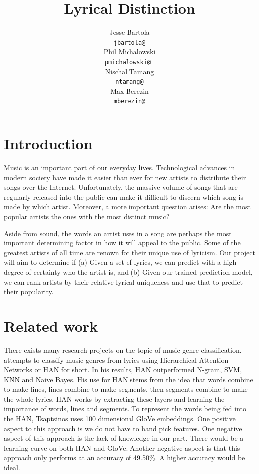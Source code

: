 \documentclass[11pt,a4paper]{article}
\title{Lyrical Distinction}
\author{Jesse Bartola \\
  {\tt jbartola@} \\\And
  Phil Michalowski \\
  {\tt pmichalowski@ } \\\And
  Nischal Tamang \\
  {\tt ntamang@} \\\And
  Max Berezin \\
  {\tt mberezin@} \\}
\date{}
\begin{document}
\maketitle

\section{Introduction}
Music is an important part of our everyday lives. Technological advances in modern society have made it easier than ever for new artists to distribute their songs over the Internet. Unfortunately, the massive volume of songs that are regularly released into the public can make it difficult to discern which song is made by which artist. Moreover, a more important question arises: Are the most popular artists the ones with the most distinct music?

Aside from sound, the words an artist uses in a song are perhaps the most important determining factor in how it will appeal to the public. Some of the greatest artists of all time are renown for their unique use of lyricism. Our project will aim to determine if (a) Given a set of lyrics, we can predict with a high degree of certainty who the artist is, and (b) Given our trained prediction model, we can rank artists by their relative lyrical uniqueness and use that to predict their popularity.


\section{Related work}
There exists many research projects on the topic of music genre classification.  attempts to classify music genres from lyrics using Hierarchical Attention Networks or HAN for short. In his results, HAN outperformed N-gram, SVM, KNN and Naive Bayes. His use for HAN stems from the idea that words combine to make lines, lines combine to make segments, then segments combine to make the whole lyrics. HAN works by extracting these layers and learning the importance of words, lines and segments. To represent the words being fed into the HAN, Tsaptsinos uses 100 dimensional GloVe embeddings. One positive aspect to this approach is we do not have to hand pick features. One negative aspect of this approach is the lack of knowledge in our part. There would be a learning curve on both HAN and GloVe. Another negative aspect is that this approach only performs at an accuracy of 49.50\%. A higher accuracy would be ideal. 
\end{document}
